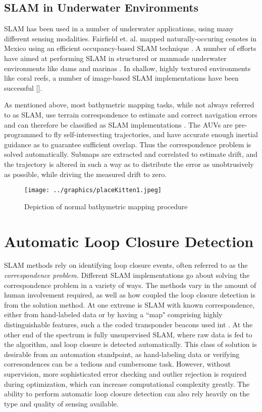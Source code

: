 \subsection{SLAM in Underwater Environments}

SLAM has been used in a number of underwater applications, using many different sensing modalities. Fairfield et. al. mapped naturally-occuring cenotes in Mexico using an efficient occupancy-based SLAM technique \cite{Fairfield...}. A number of efforts have aimed at performing SLAM in structured or manmade underwater environments like dams and marinas \cite{Ribas}. In shallow, highly textured environments like coral reefs, a number of image-based SLAM implementations have been successful [\cite{?}].

As mentioned above, most bathymetric mapping tasks, while not always referred to as SLAM, use terrain correspondence to estimate and correct navigation errors and can therefore be classified as SLAM implementations \cite{anything by Caress}. The AUVs are pre-programmed to fly self-intersecting trajectories, and have accurate enough inertial guidance as to guarantee sufficient overlap. Thus the correspondence problem is solved automatically. Submaps are extracted and correlated to estimate drift, and the trajectory is altered in such a way as to distribute the error as unobtrusively as possible, while driving the measured drift to zero.

 \begin{figure}[htbp]
   \centering
   \texttt{[image: ../graphics/placeKitten1.jpeg]} %
   \caption{Depiction of normal bathymetric mapping procedure}
   \label{fig:BathyMapping}
\end{figure}


\section{Automatic Loop Closure Detection}

SLAM methods rely on identifying loop closure events, often referred to as the \emph{correspondence problem.} Different SLAM implementations go about solving the correspondence problem in a variety of ways. The methods vary in the amount of human involvement required, as well as how coupled the loop closure detection is from the solution method. At one extreme is SLAM with known correspondence, either from hand-labeled data or by having a ``map" comprising highly distinguishable features, such a the coded transponder beacons used int \cite{xponderslam?}. At the other end of the spectrum is fully unsupervised SLAM, where raw data is fed to the algorithm, and loop closure is detected automatically. This class of solution is desirable from an automation standpoint, as hand-labeling data or verifying corresondences can be a tedious and cumbersome task. However, without supervision, more sophisticated error checking and outlier rejection is required during optimization, which can increase computational complexity greatly. The ability to perform automatic loop closure detection can also rely heavily on the type and quality of sensing available.

